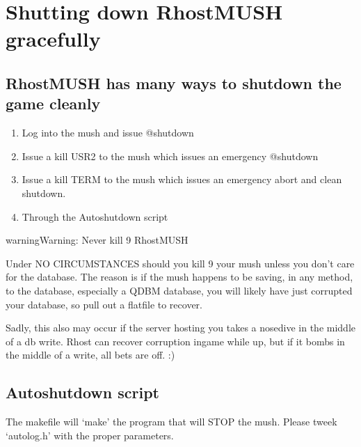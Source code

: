 \documentclass[letterpaper,10pt,english]{sphinxmanual}
\begin{document}
\section{Shutting down RhostMUSH gracefully}
\label{\detokenize{maintenance:shutting-down-rhostmush-gracefully}}

\subsection{RhostMUSH has many ways to shutdown the game cleanly}
\label{\detokenize{maintenance:rhostmush-has-many-ways-to-shutdown-the-game-cleanly}}\begin{enumerate}
%
\item {} 
\sphinxAtStartPar
Log into the mush and issue @shutdown

\item {} 
\sphinxAtStartPar
Issue a kill \sphinxhyphen{}USR2 to the mush which issues an emergency @shutdown

\item {} 
\sphinxAtStartPar
Issue a kill \sphinxhyphen{}TERM to the mush which issues an emergency abort and clean shutdown.

\item {} 
\sphinxAtStartPar
Through the Autoshutdown script

\end{enumerate}

\begin{sphinxadmonition}{warning}{Warning:}
\sphinxAtStartPar
Never kill \sphinxhyphen{}9 RhostMUSH

\sphinxAtStartPar
Under NO CIRCUMSTANCES should you kill \sphinxhyphen{}9 your mush unless you don’t care for the
database.  The reason is if the mush happens to be saving, in any method, to the
database, especially a QDBM database, you will likely have just corrupted your
database, so pull out a flatfile to recover.

\sphinxAtStartPar
Sadly, this also may occur if the server hosting you takes a nose\sphinxhyphen{}dive in the middle
of a db write.  Rhost can recover corruption in\sphinxhyphen{}game while up, but if it bombs
in the middle of a write, all bets are off. :)
\end{sphinxadmonition}


\subsection{Autoshutdown script}
\label{\detokenize{maintenance:autoshutdown-script}}
\sphinxAtStartPar
The makefile will ‘make’ the program that will STOP the mush.
Please tweek ‘autolog.h’ with the proper parameters.
\end{document}
